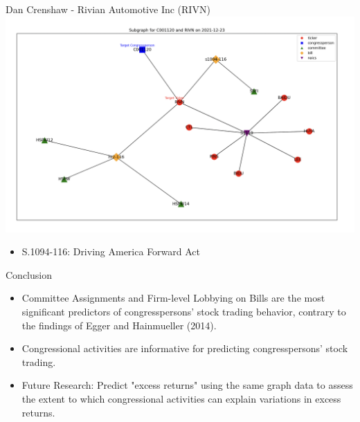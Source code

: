 \documentclass{beamer}
\begin{document}
	\begin{frame}{Dan Crenshaw - Rivian Automotive Inc (RIVN)} 		
		\centering	\includegraphics[scale=0.22]{./images/rvin.png}
		\begin{itemize}
			\item S.1094-116: Driving America Forward Act
	\end{itemize}
	\end{frame}

	\begin{frame}{Conclusion} 		
		\begin{itemize}
			\item Committee Assignments and Firm-level Lobbying on Bills are the most significant predictors of congresspersons' stock trading behavior, contrary to the findings of Egger and Hainmueller (2014).
			\item Congressional activities are informative for predicting congresspersons' stock trading.
			\item Future Research: Predict "excess returns" using the same graph data to assess the extent to which congressional activities can explain variations in excess returns.
		\end{itemize}
	\end{frame}
	
	
\end{document}
